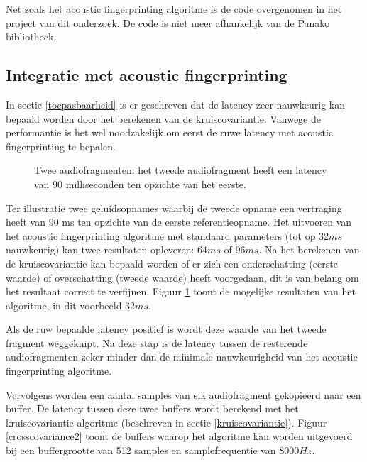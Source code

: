 Net zoals het acoustic fingerprinting algoritme is de code overgenomen in het project van dit onderzoek. De code is niet meer afhankelijk van de Panako bibliotheek.

\subsection{Integratie met acoustic fingerprinting}
\label{integratie-acoustic-fingerprinting}

In sectie \ref{toepasbaarheid} is er geschreven dat de latency zeer nauwkeurig kan bepaald worden door het berekenen van de kruiscovariantie. Vanwege de performantie is het wel noodzakelijk om eerst de ruwe latency met acoustic fingerprinting te bepalen. 

\begin{figure}[h!]
	\captionsetup{width=0.7\textwidth}
	\caption[Kruiscovariantie audiofragmenten]{Twee audiofragmenten: het tweede audiofragment heeft een latency van 90 milliseconden ten opzichte van het eerste.}
	\begin{center}
		\advance\parskip0.3cm
		
	\end{center}
	\label{crosscovariance1}
\end{figure}

Ter illustratie twee geluidsopnames waarbij de tweede opname een vertraging heeft van 90 ms ten opzichte van de eerste referentieopname. Het uitvoeren van het acoustic fingerprinting algoritme met standaard parameters (tot op $ 32 ms $ nauwkeurig) kan twee resultaten opleveren: $ 64 ms $ of $ 96 ms $. Na het berekenen van de kruiscovariantie kan bepaald worden of er zich een onderschatting (eerste waarde) of overschatting (tweede waarde) heeft voorgedaan, dit is van belang om het resultaat correct te verfijnen. Figuur \ref{crosscovariance1} toont de mogelijke resultaten van het algoritme, in dit voorbeeld $32ms$.

Als de ruw bepaalde latency positief is wordt deze waarde van het tweede fragment weggeknipt. Na deze stap is de latency tussen de resterende audiofragmenten zeker minder dan de minimale nauwkeurigheid van het acoustic fingerprinting algoritme. 

Vervolgens worden een aantal samples van elk audiofragment gekopieerd naar een buffer. De latency tussen deze twee buffers wordt berekend met het kruiscovariantie algoritme (beschreven in sectie \ref{kruiscovariantie}). Figuur \ref{crosscovariance2} toont de buffers waarop het algoritme kan worden uitgevoerd bij een buffergrootte van 512 samples en samplefrequentie van $ 8000Hz $.

